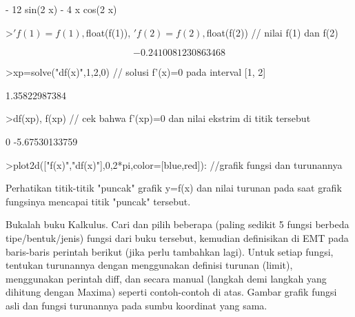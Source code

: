 \documentclass[a4paper,10pt]{article}
\begin{document}
\begin{eulernotebook}
\begin{eulercomment}
\begin{eulercomment}
\begin{eulercomment}
\begin{eulercomment}
\begin{eulercomment}
\begin{eulercomment}
\begin{eulercomment}
\begin{eulercomment}
\begin{eulercomment}
\begin{eulercomment}
\begin{eulercomment}
\begin{eulercomment}
\begin{eulercomment}
\begin{eulercomment}
\begin{eulercomment}
\begin{eulercomment}
\begin{eulercomment}
\begin{eulercomment}
\begin{eulercomment}
\begin{eulercomment}
\begin{euleroutput}
                       - 12 sin(2 x) - 4 x cos(2 x)
  
\end{euleroutput}
\begin{eulerprompt}
>$'f(1)=f(1), $float(f(1)), $'f(2)=f(2), $float(f(2)) // nilai f(1) dan f(2)
\end{eulerprompt}
\begin{eulerformula}
\[
-0.2410081230863468
\]
\end{eulerformula}
\begin{eulerprompt}
>xp=solve("df(x)",1,2,0) // solusi f'(x)=0 pada interval [1, 2]
\end{eulerprompt}
\begin{euleroutput}
  1.35822987384
\end{euleroutput}
\begin{eulerprompt}
>df(xp), f(xp) // cek bahwa f'(xp)=0 dan nilai ekstrim di titik tersebut
\end{eulerprompt}
\begin{euleroutput}
  0
  -5.67530133759
\end{euleroutput}
\begin{eulerprompt}
>plot2d(["f(x)","df(x)"],0,2*pi,color=[blue,red]): //grafik fungsi dan turunannya
\end{eulerprompt}
\begin{eulercomment}
Perhatikan titik-titik "puncak" grafik y=f(x) dan nilai turunan pada
saat grafik fungsinya mencapai titik "puncak" tersebut.
\end{eulercomment}
\begin{eulercomment}
Bukalah buku Kalkulus. Cari dan pilih beberapa (paling sedikit 5
fungsi berbeda tipe/bentuk/jenis) fungsi dari buku tersebut, kemudian
definisikan di EMT pada baris-baris perintah berikut (jika perlu
tambahkan lagi). Untuk setiap fungsi, tentukan turunannya dengan
menggunakan definisi turunan (limit), menggunakan perintah diff, dan
secara manual (langkah demi langkah yang dihitung dengan Maxima)
seperti contoh-contoh di atas. Gambar grafik fungsi asli dan fungsi
turunannya pada sumbu koordinat yang sama.
\end{eulercomment}
\begin{eulercomment}

\end{eulercomment}
\end{eulercomment}
\end{eulercomment}
\end{eulercomment}
\end{eulercomment}
\end{eulercomment}
\end{eulercomment}
\end{eulercomment}
\end{eulercomment}
\end{eulercomment}
\end{eulercomment}
\end{eulercomment}
\end{eulercomment}
\end{eulercomment}
\end{eulercomment}
\end{eulercomment}
\end{eulercomment}
\end{eulercomment}
\end{eulercomment}
\end{eulercomment}
\end{eulercomment}
\end{eulernotebook}
\end{document}
